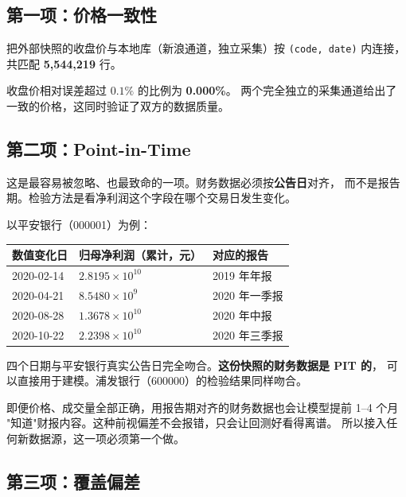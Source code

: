 \subsection{第一项：价格一致性}

把外部快照的收盘价与本地库（新浪通道，独立采集）按 \texttt{(code, date)} 内连接，
共匹配 \textbf{5,544,219} 行。

\begin{keybox}[结果]
收盘价相对误差超过 $0.1\%$ 的比例为 \textbf{0.000\%}。
两个完全独立的采集通道给出了一致的价格，这同时验证了双方的数据质量。
\end{keybox}

\subsection{第二项：Point-in-Time}

这是最容易被忽略、也最致命的一项。财务数据必须按\textbf{公告日}对齐，
而不是报告期。检验方法是看净利润这个字段在哪个交易日发生变化。

以平安银行（000001）为例：

\begin{center}
\begin{tabular}{@{}lll@{}}
\toprule
数值变化日 & 归母净利润（累计，元） & 对应的报告 \\
\midrule
2020-02-14 & $2.8195\times10^{10}$ & 2019 年年报 \\
2020-04-21 & $8.5480\times10^{9}$ & 2020 年一季报 \\
2020-08-28 & $1.3678\times10^{10}$ & 2020 年中报 \\
2020-10-22 & $2.2398\times10^{10}$ & 2020 年三季报 \\
\bottomrule
\end{tabular}
\end{center}

四个日期与平安银行真实公告日完全吻合。\textbf{这份快照的财务数据是 PIT 的}，
可以直接用于建模。浦发银行（600000）的检验结果同样吻合。

\begin{warnbox}[如果这一项没通过]
即便价格、成交量全部正确，用报告期对齐的财务数据也会让模型提前 1--4 个月
"知道"财报内容。这种前视偏差不会报错，只会让回测好看得离谱。
所以接入任何新数据源，这一项必须第一个做。
\end{warnbox}

\subsection{第三项：覆盖偏差}

